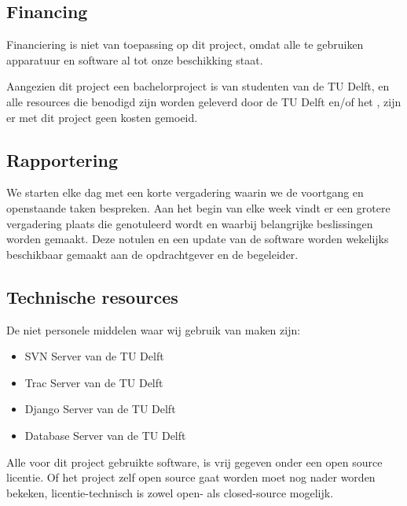 \subsection{Financing}

Financiering is niet van toepassing op dit project, omdat alle te gebruiken apparatuur en software al tot onze beschikking staat.

Aangezien dit project een bachelorproject is van studenten van de TU Delft, en alle resources die benodigd zijn worden geleverd door de TU Delft en/of het \casamproject, zijn er met dit project geen kosten gemoeid.

\subsection{Rapportering}

We starten elke dag met een korte vergadering waarin we de voortgang en openstaande taken bespreken. Aan het begin van elke week vindt er een grotere vergadering plaats die genotuleerd wordt en waarbij belangrijke beslissingen worden gemaakt. Deze notulen en een update van de software worden wekelijks beschikbaar gemaakt aan de opdrachtgever en de begeleider.

\subsection{Technische resources}

De niet personele middelen waar wij gebruik van maken zijn:
\begin{itemize}
	\item SVN Server van de TU Delft
	\item Trac Server van de TU Delft
	\item Django Server van de TU Delft
	\item Database Server van de TU Delft
\end{itemize}
Alle voor dit project gebruikte software, is vrij gegeven onder een open source licentie. 
Of het project zelf open source gaat worden moet nog nader worden bekeken, licentie-technisch is zowel open- als closed-source mogelijk.
\pagebreak